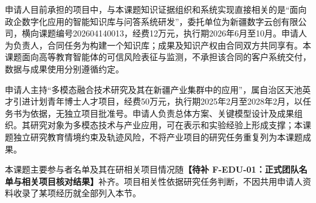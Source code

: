 \justifying
\NSFCBodyText

申请人目前承担的项目中，与本课题知识证据组织和系统实现直接相关的是“面向政企数字化应用的智能知识库与问答系统研发”，委托单位为新疆数字云创有限公司，横向课题编号202604140013，经费12万元，执行期2026年6月至10月。申请人为负责人，合同任务为构建一个知识库；成果及知识产权由合同双方共同享有。本课题面向高等教育智能体的可信风险表征与监测，不承担该合同的客户系统交付，数据与成果使用分别遵循约定。

申请人主持“多模态融合技术研究及其在新疆产业集群中的应用”，属自治区天池英才引进计划青年博士人才项目，经费50万元，执行期2025年2月至2028年2月，以任务书为依据，无独立项目批准号。申请人负责总体方案、关键模型设计及成果组织。其研究对象为多模态技术与产业应用，可在表示和实验经验上形成支撑；本课题独立研究教育情境约束及轨迹风险，不将产业项目的研究任务重复列为本课题成果。

本课题主要参与者名单及其在研相关项目情况随\textbf{【待补 F-EDU-01：正式团队名单与相关项目核对结果】}补齐。项目相关性依据研究任务判断，不因共用申请人资料收录了某项经历就全部列入本节。
